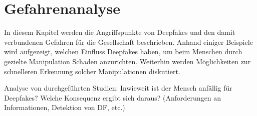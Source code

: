 \section{Gefahrenanalyse}
In diesem Kapitel werden die Angriffspunkte von Deepfakes und den damit verbundenen Gefahren für die Gesellschaft beschrieben.
Anhand einiger Beispiele wird aufgezeigt, welchen Einfluss Deepfakes haben, um beim Menschen durch gezielte Manipulation Schaden anzurichten.
Weiterhin werden Möglichkeiten zur schnelleren Erkennung solcher Manipulationen diskutiert.





Analyse von durchgeführten Studien: Inwieweit ist der Mensch anfällig für Deepfakes?
Welche Konsequenz ergibt sich daraus? (Anforderungen an Informationen, Detektion von DF, etc.)
